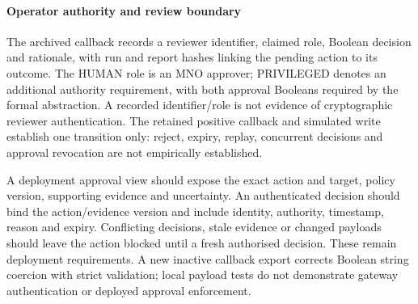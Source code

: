 \documentclass[journal]{IEEEtran}
\newif\ifshowrevisions
\newenvironment{revision}{\begingroup\ifshowrevisions\color{blue}\else\color{black}\fi}{\endgroup}
\begin{document}
\begin{revision}
\paragraph{Operator authority and review boundary}
The archived callback records a reviewer identifier, claimed role, Boolean
decision and rationale, with run and report hashes linking the pending action
to its outcome. The HUMAN role is an MNO approver; PRIVILEGED denotes an
additional authority requirement, with both approval Booleans required by
the formal abstraction. A recorded identifier/role is not evidence of
cryptographic reviewer authentication. The retained positive callback and
simulated write establish one transition only: reject, expiry, replay,
concurrent decisions and approval revocation are not empirically established.

A deployment approval view should expose the exact action and target, policy
version, supporting evidence and uncertainty. An authenticated decision should
bind the action/evidence version and include identity, authority, timestamp,
reason and expiry. Conflicting decisions, stale evidence or changed payloads
should leave the action blocked until a fresh authorised decision. These
remain deployment requirements. A new inactive callback export corrects
Boolean string coercion with strict validation; local payload tests do not
demonstrate gateway authentication or deployed approval enforcement.
\end{revision}
\end{document}
